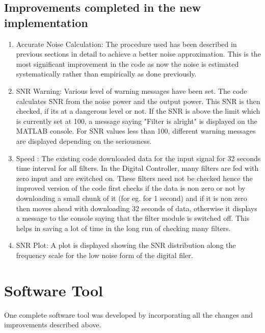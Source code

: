 \documentclass[colorlinks=true,pdfstartview=FitV,linkcolor=blue,
            citecolor=red,urlcolor=magenta]{ligodoc}
\begin{document}
	\subsection{Improvements completed in the new implementation} 
	\begin{enumerate}
		\item Accurate Noise Calculation: The procedure used has been described in previous sections in detail to achieve a better noise approximation. This is the most significant improvement in the code as now the noise is estimated systematically rather than empirically as done previously. 
		\item SNR Warning: Various level of warning messages have been set. The code calculates SNR from the noise power and the output power. This SNR is then checked, if its at a dangerous level or not. If the SNR is above the limit which is currently set at 100, a message saying "Filter is alright" is displayed on the MATLAB console. For SNR values less than 100, different warning messages are displayed depending on the seriousness. 
		\item Speed : The existing code downloaded data for the input signal for 32 seconds time interval for all filters. In the Digital Controller, many filters are fed with zero input and are switched on. These filters need not be checked hence the improved version of the code first checks if the data is non zero or not by downloading a small chunk of it (for eg. for 1 second) and if it is non zero then moves ahead with downloading 32 seconds of data, otherwise it displays a message to the console saying that the filter module is switched off. This helps in saving a lot of time in the long run of checking many filters.  
		\item SNR Plot: A plot is displayed showing the SNR distribution along the frequency scale for the low noise form of the digital filer. 
	\end{enumerate}
\section{Software Tool}
	One complete software tool was developed by incorporating all the changes and improvements described above. 
\end{document}
